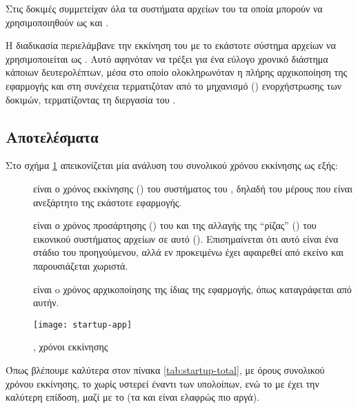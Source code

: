 Στις δοκιμές συμμετείχαν όλα τα συστήματα αρχείων του \osv{} τα οποία μπορούν να
χρησιμοποιηθούν ως  και \viofs{}.

Η διαδικασία περιελάμβανε την εκκίνηση του \osv{} με το εκάστοτε σύστημα αρχείων
να χρησιμοποιείται ως . Αυτό αφηνόταν να τρέξει για ένα
εύλογο χρονικό διάστημα κάποιων δευτερολέπτων, μέσα στο οποίο ολοκληρωνόταν η
πλήρης αρχικοποίηση της εφαρμογής και στη συνέχεια τερματιζόταν από το μηχανισμό
() ενορχήστρωσης των δοκιμών, τερματίζοντας τη διεργασία του \qemu{}.

\subsection{Αποτελέσματα}
Στο σχήμα \ref{fig:startup-app} απεικονίζεται μία ανάλυση του συνολικού χρόνου
εκκίνησης ως εξής:
\begin{description}
    \item[] είναι ο χρόνος εκκίνησης () του συστήματος του
                         \osv{}, δηλαδή του μέρους που είναι ανεξάρτητο της
                         εκάστοτε εφαρμογής.
    \item[] είναι ο χρόνος προσάρτησης () του
                               και της αλλαγής της
                              ``ρίζας'' (\en{/}) του εικονικού συστήματος
                              αρχείων σε αυτό (). Επισημαίνεται ότι
                              αυτό είναι ένα στάδιο του προηγούμενου, αλλά εν
                              προκειμένω έχει αφαιρεθεί από εκείνο και
                              παρουσιάζεται χωριστά.
    \item[] είναι o χρόνος αρχικοποίησης της ίδιας της
                            εφαρμογής, όπως καταγράφεται από αυτήν.
\end{description}

\begin{figure}
    \texttt{[image: startup-app]}
    \caption{, χρόνοι εκκίνησης}
    \label{fig:startup-app}
\end{figure}


Όπως βλέπουμε καλύτερα στον πίνακα \ref{tab:startup-total}, με όρους συνολικού
χρόνου εκκίνησης, το \viofs{} χωρίς  υστερεί έναντι των
υπολοίπων, ενώ το \viofs{} με  έχει την καλύτερη επίδοση, μαζί με
το  (τα  και  είναι ελαφρώς πιο αργά).

